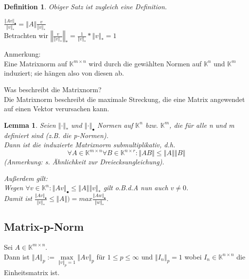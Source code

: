 \documentclass[a4paper,10pt]{scrartcl}
\newcommand{\norm}[1]{ \left\Vert #1 \right\Vert }
\newtheorem[L]{satz}{Satz}[section]
\newtheorem{definition}{Definition}[section]
\newtheorem{lemma}{Lemma}[section]
\newtheorem[S]{beweis}{Beweis}
\newtheorem[S]{beh}{Behauptung}
\begin{document}
\begin{definition}
 Obiger Satz ist zugleich eine Definition.
\end{definition}

\smallskip

\begin{beweis}
$\frac{\norm{Av}_\bullet}{\norm{v}_*} = \norm{A} \frac{v}{\norm{v}_*}$\\
Betrachten wir $\norm{\frac{v}{\norm{v}_*}}_* = \frac{1}{\norm{v}_*} * \norm{v}_* = 1$
\end{beweis}

\smallskip

Anmerkung:\\
Eine Matrixnorm auf $\mathbb{K}^{m 
\times n}$ wird durch die gewählten Normen auf $\mathbb{K}^n$ und $\mathbb{K}^m$ induziert; sie hängen also von diesen ab.\\

\smallskip

Was beschreibt die Matrixnorm?\\
Die Matrixnorm beschreibt die maximale Streckung, die eine Matrix angewendet auf einen Vektor verursachen kann.

\bigskip

\begin{lemma}
Seien $\norm{\cdot}_*$ und $\norm{\cdot}_\bullet$ Normen auf $\mathbb{K}^n$ bzw. $\mathbb{K}^m$, die für alle n und m definiert sind (z.B. die p-Normen).\\
Dann ist die induzierte Matrixnorm submultiplikativ, d.h. 
$$\forall A \in \mathbb{K}^{m \times n} \forall B \in \mathbb{K}^{n \times r} :
\norm{AB} \leq \norm{A} \norm{B}$$
(Anmerkung: s. Ähnlichkeit zur Dreiecksungleichung).

\bigskip

Außerdem gilt:\\
Wegen $\forall v \in \mathbb{K}^n: \norm{Av}_\bullet \leq \norm{A} \norm{v}_*$ gilt o.B.d.A nun auch $ v \neq 0 $.\\
Damit ist $\frac{\norm{Av}_\bullet}{\norm{v}_*} \leq \norm{A}) = max \frac{\norm{Aw}_\bullet }{\norm{w}_*}$.

\end{lemma}

\newpage

\subsection{Matrix-p-Norm}
Sei $A \in \mathbb{K}^{m \times n}$.\\
Dann ist $\norm{A}_p := \max\limits_{\norm{v}_p = 1} \norm{Av}_p$ für $ 1 \leq p \leq \infty$ und $\norm{I_n}_p = 1$ wobei $I_n \in \mathbb{K}^{n \times n}$ die Einheitsmatrix ist.\\
\end{document}

